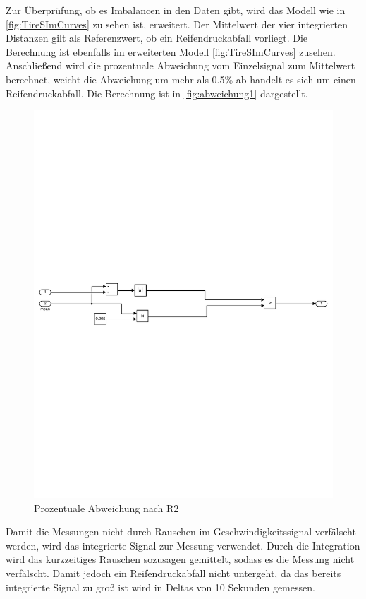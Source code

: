 Zur Überprüfung, ob es Imbalancen in den Daten gibt, wird das Modell wie in \autoref{fig:TireSImCurves} zu sehen ist, erweitert.
Der Mittelwert der vier integrierten Distanzen gilt als Referenzwert, ob ein Reifendruckabfall vorliegt. Die Berechnung ist ebenfalls im erweiterten Modell \autoref{fig:TireSImCurves} zusehen. Anschließend wird die prozentuale Abweichung vom Einzelsignal zum Mittelwert berechnet, weicht die Abweichung um mehr als 0.5\% ab handelt es sich um einen Reifendruckabfall. Die Berechnung ist in \autoref{fig:abweichung1} dargestellt. 
\vspace{-1em}
\begin{figure}[H]
	\centering
	\includegraphics[width=1\linewidth]{../Graphiken/PDFSplit/3_PDFsam_SebastianTireSim2.pdf}
	\caption{Prozentuale Abweichung nach R2}
	\label{fig:abweichung1}
\end{figure}
\vspace{-1em}
Damit die Messungen nicht durch Rauschen im Geschwindigkeitssignal verfälscht werden, wird das integrierte Signal zur Messung verwendet. Durch die Integration wird das kurzzeitiges Rauschen sozusagen gemittelt, sodass es die Messung nicht verfälscht. Damit jedoch ein Reifendruckabfall nicht untergeht, da das bereits integrierte Signal zu groß ist wird in Deltas von 10 Sekunden gemessen.\\
